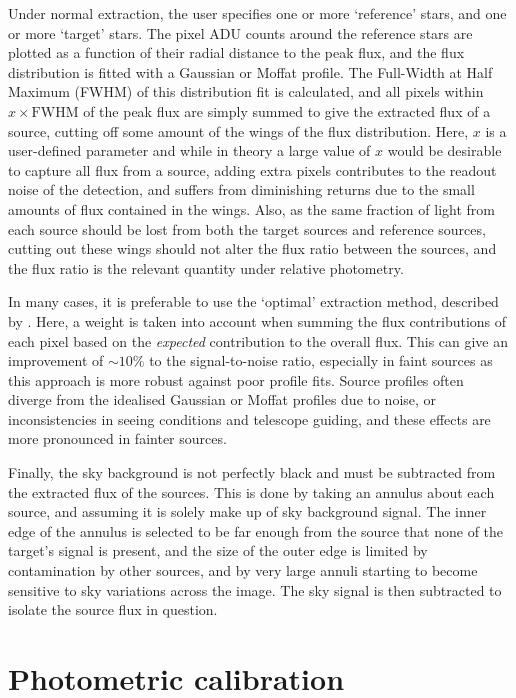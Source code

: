 Under normal extraction, the user specifies one or more `reference' stars, and one or more `target' stars. The pixel ADU counts around the reference stars are plotted as a function of their radial distance to the peak flux, and the flux distribution is fitted with a Gaussian or Moffat profile. The Full-Width at Half Maximum (FWHM) of this distribution fit is calculated, and all pixels within $x \times \mathrm{FWHM}$ of the peak flux are simply summed to give the extracted flux of a source, cutting off some amount of the wings of the flux distribution. Here, $x$ is a user-defined parameter and while in theory a large value of $x$ would be desirable to capture all flux from a source, adding extra pixels contributes to the readout noise of the detection, and suffers from diminishing returns due to the small amounts of flux contained in the wings.
Also, as the same fraction of light from each source should be lost from both the target sources and reference sources, cutting out these wings should not alter the flux ratio between the sources, and the flux ratio is the relevant quantity under relative photometry.

In many cases, it is preferable to use the `optimal' extraction method, described by \citet{naylor1998}. Here, a weight is taken into account when summing the flux contributions of each pixel based on the {\it expected} contribution to the overall flux. This can give an improvement of $\sim 10\%$ to the signal-to-noise ratio, especially in faint sources as this approach is more robust against poor profile fits. Source profiles often diverge from the idealised Gaussian or Moffat profiles due to noise, or inconsistencies in seeing conditions and telescope guiding, and these effects are more pronounced in fainter sources. 

Finally, the sky background is not perfectly black and must be subtracted from the extracted flux of the sources. This is done by taking an annulus about each source, and assuming it is solely make up of sky background signal. The inner edge of the annulus is selected to be far enough from the source that none of the target's signal is present, and the size of the outer edge is limited by contamination by other sources, and by very large annuli starting to become sensitive to sky variations across the image. The sky signal is then subtracted to isolate the source flux in question.


\section{Photometric calibration}
\label{sect:photometric extraction and calibration}

